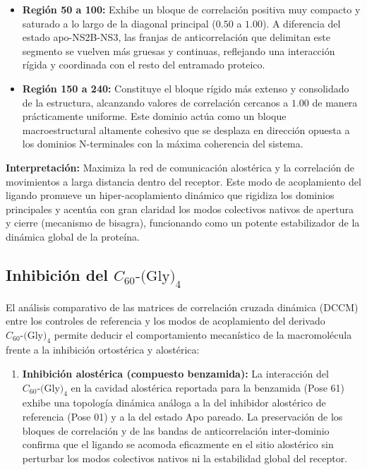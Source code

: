 \begin{table}[htbp]
\begin{itemize}
    \item \textbf{Región 50 a 100:} Exhibe un bloque de correlación positiva muy compacto y saturado a lo largo de la diagonal principal ($0.50$ a $1.00$). A diferencia del estado apo-NS2B-NS3, las franjas de anticorrelación que delimitan este segmento se vuelven más gruesas y continuas, reflejando una interacción rígida y coordinada con el resto del entramado proteico.
    
    \item \textbf{Región 150 a 240:} Constituye el bloque rígido más extenso y consolidado de la estructura, alcanzando valores de correlación cercanos a $1.00$ de manera prácticamente uniforme. Este dominio actúa como un bloque macroestructural altamente cohesivo que se desplaza en dirección opuesta a los dominios N-terminales con la máxima coherencia del sistema.
\end{itemize}

\textbf{Interpretación:} Maximiza la red de comunicación alostérica y la correlación de movimientos a larga distancia dentro del receptor. Este modo de acoplamiento del ligando promueve un hiper-acoplamiento dinámico que rigidiza los dominios principales y acentúa con gran claridad los modos colectivos nativos de apertura y cierre (mecanismo de bisagra), funcionando como un potente estabilizador de la dinámica global de la proteína.

\subsection*{Inhibición del $C_{60}\text{-(Gly)}_4$}

El análisis comparativo de las matrices de correlación cruzada dinámica (DCCM) entre los controles de referencia y los modos de acoplamiento del derivado $C_{60}\text{-(Gly)}_4$ permite deducir el comportamiento mecanístico de la macromolécula frente a la inhibición ortostérica y alostérica:

\begin{enumerate}
    \item \textbf{Inhibición alostérica (compuesto benzamida):} La interacción del $C_{60}\text{-(Gly)}_4$ en la cavidad alostérica reportada para la benzamida (Pose 61) exhibe una topología dinámica análoga a la del inhibidor alostérico de referencia (Pose 01) y a la del estado Apo pareado. La preservación de los bloques de correlación y de las bandas de anticorrelación inter-dominio confirma que el ligando se acomoda eficazmente en el sitio alostérico sin perturbar los modos colectivos nativos ni la estabilidad global del receptor.


\end{enumerate}
\end{table}
